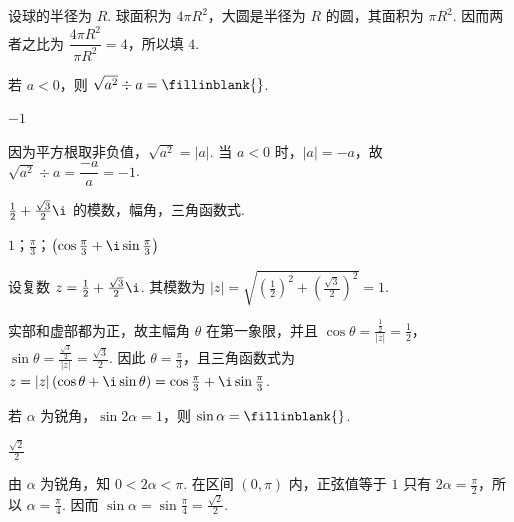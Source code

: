 \begin{solution}
设球的半径为 \(R\). 球面积为 \(4\pi R^2\)，大圆是半径为 \(R\) 的圆，其面积为 \(\pi R^2\). 因而两者之比为 \(\dfrac{4\pi R^2}{\pi R^2}=4\)，所以填 \(4\).
\end{solution}

\begin{problem}
若 \(a<0\)，则 \( \sqrt{a^2}\div a=\fillinblank{} \).
\end{problem}

\begin{answer}
\(-1\)
\end{answer}

\begin{solution}
因为平方根取非负值，\(\sqrt{a^2}=|a|\). 当 \(a<0\) 时，\(|a|=-a\)，故 \(\sqrt{a^2}\div a=\dfrac{-a}{a}=-1\).
\end{solution}

\begin{problem}
\( \frac{1}{2}+\frac{\sqrt{3}}{2}\i \) 的模数\fillinblank{}，幅角\fillinblank{}，三角函数式\fillinblank{}.
\end{problem}

\begin{answer}
\(1\)；\(\frac{\pi}{3}\)；\(\left( \cos \frac{\pi}{3}+\i\sin \frac{\pi}{3} \right)\)
\end{answer}

\begin{solution}
设复数 \(z=\frac{1}{2}+\frac{\sqrt{3}}{2}\i\). 其模数为
\( |z|=\sqrt{\left(\frac{1}{2}\right)^2+\left(\frac{\sqrt{3}}{2}\right)^2}=1\).

实部和虚部都为正，故主幅角 \(\theta\) 在第一象限，并且
\(\cos\theta=\frac{\frac{1}{2}}{|z|}=\frac{1}{2}\)，\(\sin\theta=\frac{\frac{\sqrt{3}}{2}}{|z|}=\frac{\sqrt{3}}{2}\). 因此 \(\theta=\frac{\pi}{3}\)，且三角函数式为
\(z=|z|\left(\cos\theta+\i\sin\theta\right)=\cos\frac{\pi}{3}+\i\sin\frac{\pi}{3}\).
\end{solution}

\begin{problem}
若 \(\alpha\) 为锐角，\(\sin 2\alpha=1\)，则 \(\sin \alpha=\fillinblank{}\).
\end{problem}

\begin{answer}
\(\frac{\sqrt{2}}{2}\)
\end{answer}

\begin{solution}
由 \(\alpha\) 为锐角，知 \(0<2\alpha<\pi\). 在区间 \((0,\pi)\) 内，正弦值等于 \(1\) 只有 \(2\alpha=\frac{\pi}{2}\)，所以 \(\alpha=\frac{\pi}{4}\). 因而 \(\sin\alpha=\sin\frac{\pi}{4}=\frac{\sqrt{2}}{2}\).
\end{solution}

